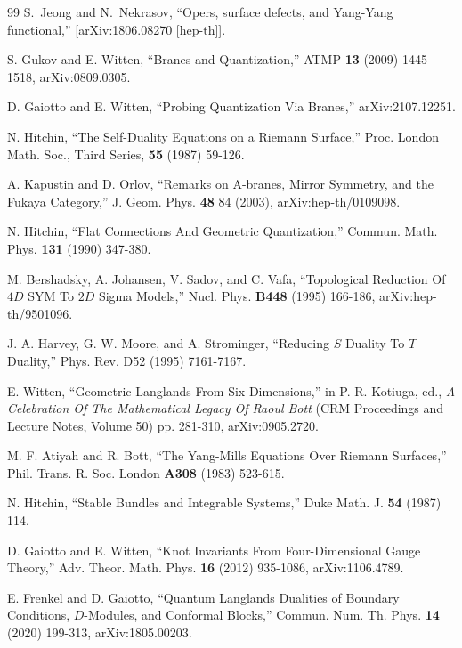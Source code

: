\begin{thebibliography}{99}
S.~Jeong and N.~Nekrasov,
``Opers, surface defects, and Yang-Yang functional,''
[arXiv:1806.08270 [hep-th]].



S. Gukov and E. Witten, ``Branes and Quantization,'' ATMP {\bf 13} (2009) 1445-1518, arXiv:0809.0305.

 D. Gaiotto and E. Witten, ``Probing Quantization Via Branes,'' arXiv:2107.12251.

N. Hitchin, ``The Self-Duality Equations on a Riemann Surface,'' Proc. London Math. Soc., Third Series, {\bf 55} (1987) 59-126.



A. Kapustin and D. Orlov, ``Remarks on A-branes, Mirror Symmetry, and the Fukaya
Category,'' J. Geom. Phys. {\bf 48} 84 (2003), arXiv:hep-th/0109098.

  N. Hitchin, ``Flat Connections And Geometric Quantization,'' Commun. Math. Phys. {\bf 131} (1990) 347-380.



  M. Bershadsky, A. Johansen, V. Sadov, and C. Vafa, ``Topological Reduction Of $4  D$ SYM To $2  D$ Sigma Models,'' Nucl. Phys. {\bf B448} (1995) 166-186, arXiv:hep- th/9501096.
 
 J. A. Harvey, G. W. Moore, and A. Strominger, ``Reducing $S$ Duality To $T$ Duality,'' Phys. Rev. D52 (1995) 7161-7167.

E. Witten, ``Geometric Langlands From Six Dimensions,'' in P. R. Kotiuga, ed., {\it A Celebration Of The Mathematical Legacy Of Raoul Bott} 
(CRM Proceedings and Lecture Notes, Volume 50) pp. 281-310, arXiv:0905.2720.

M. F. Atiyah and R. Bott, ``The Yang-Mills Equations Over Riemann Surfaces,'' Phil. Trans.  R. Soc. London {\bf A308} (1983) 523-615.

 N. Hitchin, ``Stable Bundles and Integrable Systems,'' Duke Math. J. {\bf 54} (1987) 114.

 D. Gaiotto and E. Witten, ``Knot Invariants From Four-Dimensional Gauge Theory,'' Adv. Theor. Math. Phys. {\bf 16} (2012) 935-1086,  arXiv:1106.4789.

E. Frenkel and D. Gaiotto, ``Quantum Langlands Dualities of Boundary Conditions, $D$-Modules, and Conformal Blocks,'' Commun. Num. Th. Phys.
{\bf 14} (2020) 199-313, arXiv:1805.00203.



\end{thebibliography}
